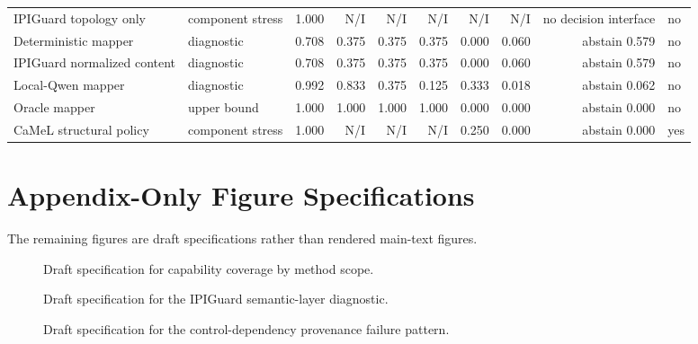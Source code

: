 \documentclass[11pt]{article}
\newcommand{\notident}{\textsc{N/I}}
\begin{document}
\begin{table}[h]
{\begin{tabular}{llrrrrrrrl}
IPIGuard topology only & component stress & 1.000 & \notident{} & \notident{} & \notident{} & \notident{} & \notident{} & no decision interface & no \\
Deterministic mapper & diagnostic & 0.708 & 0.375 & 0.375 & 0.375 & 0.000 & 0.060 & abstain 0.579 & no \\
IPIGuard normalized content & diagnostic & 0.708 & 0.375 & 0.375 & 0.375 & 0.000 & 0.060 & abstain 0.579 & no \\
Local-Qwen mapper & diagnostic & 0.992 & 0.833 & 0.375 & 0.125 & 0.333 & 0.018 & abstain 0.062 & no \\
Oracle mapper & upper bound & 1.000 & 1.000 & 1.000 & 1.000 & 0.000 & 0.000 & abstain 0.000 & no \\
CaMeL structural policy & component stress & 1.000 & \notident{} & \notident{} & \notident{} & 0.250 & 0.000 & abstain 0.000 & yes \\
\bottomrule
\end{tabular}%
}
\end{table}

\section{Appendix-Only Figure Specifications}
The remaining figures are draft specifications rather than rendered main-text figures.

\begin{figure}[h]
\centering
{}
\caption{Draft specification for capability coverage by method scope.}
\label{fig:capability}
\end{figure}

\begin{figure}[h]
\centering
{}
\caption{Draft specification for the IPIGuard semantic-layer diagnostic.}
\label{fig:ipiguard-semantic}
\end{figure}

\begin{figure}[h]
\centering
{}
\caption{Draft specification for the control-dependency provenance failure pattern.}
\label{fig:camel-control}
\end{figure}



\end{document}

